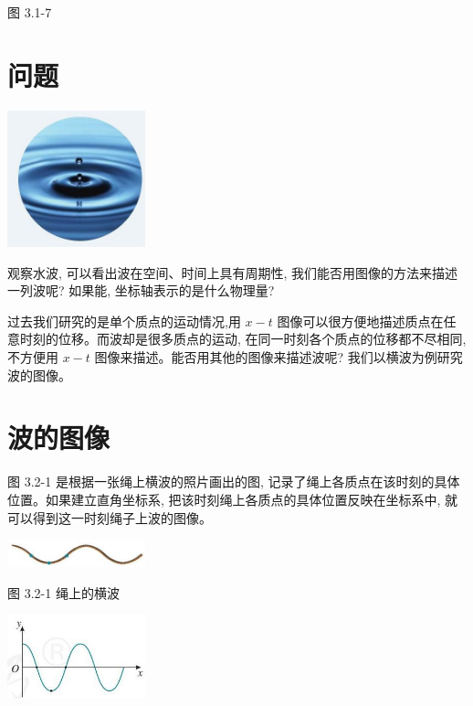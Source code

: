 \documentclass[10pt]{article}
\begin{document}
图 3.1-7

\section*{问题}

\begin{center}
\includegraphics[max width=0.3\textwidth]{images/01910e4c-ebb8-7d2c-8f2f-2375bc1d2d12_72_991675.jpg}
\end{center}

观察水波, 可以看出波在空间、时间上具有周期性, 我们能否用图像的方法来描述一列波呢? 如果能, 坐标轴表示的是什么物理量?

过去我们研究的是单个质点的运动情况,用 \(x - t\) 图像可以很方便地描述质点在任意时刻的位移。而波却是很多质点的运动, 在同一时刻各个质点的位移都不尽相同, 不方便用 \(x - t\) 图像来描述。能否用其他的图像来描述波呢? 我们以横波为例研究波的图像。

\section*{波的图像}

图 3.2-1 是根据一张绳上横波的照片画出的图, 记录了绳上各质点在该时刻的具体位置。如果建立直角坐标系, 把该时刻绳上各质点的具体位置反映在坐标系中, 就可以得到这一时刻绳子上波的图像。

\begin{center}
\includegraphics[max width=0.3\textwidth]{images/01910e4c-ebb8-7d2c-8f2f-2375bc1d2d12_72_876037.jpg}
\end{center}

图 3.2-1 绳上的横波

\begin{center}
\includegraphics[max width=0.3\textwidth]{images/01910e4c-ebb8-7d2c-8f2f-2375bc1d2d12_72_718742.jpg}
\end{center}
\end{document}
